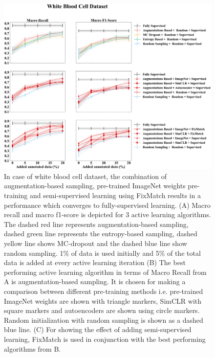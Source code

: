 \begin{figure}[htbp]
\centering
\captionsetup{format=plain}
\includegraphics[width=\textwidth]{figures/fig_2_white_recall_f1.png}
\caption{In case of white blood cell dataset, the combination of augmentation-based sampling, pre-trained ImageNet weights pre-training and semi-supervised learning using FixMatch results in a performance which converges to fully-supervised learning. (A) Macro recall and macro f1-score is depicted for 3 active learning algorithms. The dashed red line represents augmentation-based sampling, dashed green line represents the entropy-based sampling, dashed yellow line shows MC-dropout and the dashed blue line show random sampling. 1\% of data is used initially and 5\% of the total data is added at every active learning iteration (B) The best performing active learning algorithm in terms of Macro Recall from A is augmentation-based sampling. It is chosen for making a comparison between different pre-training methods i.e. pre-trained ImageNet weights are shown with triangle markers, SimCLR with square markers and autoencoders are shown using circle markers. Random initialization with random sampling is shown as a dashed blue line. (C) For showing the effect of adding semi-supervised learning, FixMatch is used in conjunction with the best performing algorithms from B.}
\label{fig:fig_2_white_recall_f1}
\end{figure}

